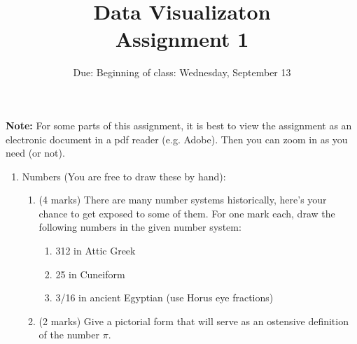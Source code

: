 \documentclass[12]{article}
\begin{document}
\title{Data Visualizaton\\ Assignment 1}
\date{Due: Beginning of class: Wednesday, September 13}
\maketitle
\noindent
{\bf Note:}
For some parts of this assignment, it is best to view the assignment as an electronic document in a pdf reader (e.g. Adobe). Then you can zoom in as you need (or not).
\begin{enumerate}
\item Numbers (You are free to draw these by hand):   
\begin{enumerate}
\item (4 marks) There are many number systems historically, here's your chance to get exposed to some of them. For one mark each, draw the following numbers in the given number system: 
\begin{enumerate}
\item 312 in Attic Greek
\item 25 in Cuneiform
\item 3/16 in ancient Egyptian (use Horus eye fractions)
\end{enumerate}
\item (2 marks) Give a pictorial form that will serve as an ostensive definition of the number $\pi$.
\end{enumerate}


\end{enumerate}
\end{document}
